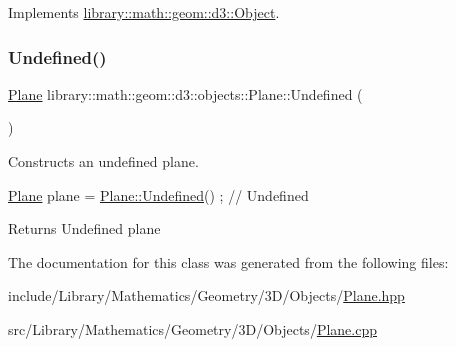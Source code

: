 Implements \hyperlink{classlibrary_1_1math_1_1geom_1_1d3_1_1_object_aa166f4ce4d116a248f0fc861c75012ca}{library\+::math\+::geom\+::d3\+::\+Object}.

\mbox{\label{classlibrary_1_1math_1_1geom_1_1d3_1_1objects_1_1_plane_a582c0e5930dd4a458c557c866b0dae17}} 
\subsubsection{\texorpdfstring{Undefined()}{Undefined()}}
{\footnotesize\ttfamily \hyperlink{classlibrary_1_1math_1_1geom_1_1d3_1_1objects_1_1_plane}{Plane} library\+::math\+::geom\+::d3\+::objects\+::\+Plane\+::\+Undefined (\begin{DoxyParamCaption}{ }\end{DoxyParamCaption})\hspace{0.3cm}{\ttfamily [static]}}



Constructs an undefined plane. 


\begin{DoxyCode}
\hyperlink{classlibrary_1_1math_1_1geom_1_1d3_1_1objects_1_1_plane_a81fe78a983e2cb6ee6ad9bfabd22c3a4}{Plane} plane = \hyperlink{classlibrary_1_1math_1_1geom_1_1d3_1_1objects_1_1_plane_a582c0e5930dd4a458c557c866b0dae17}{Plane::Undefined}() ; \textcolor{comment}{// Undefined}
\end{DoxyCode}


\begin{DoxyReturn}{Returns}
Undefined plane 
\end{DoxyReturn}


The documentation for this class was generated from the following files\+:\begin{DoxyCompactItemize}
\item 
include/\+Library/\+Mathematics/\+Geometry/3\+D/\+Objects/\hyperlink{_plane_8hpp}{Plane.\+hpp}\item 
src/\+Library/\+Mathematics/\+Geometry/3\+D/\+Objects/\hyperlink{_plane_8cpp}{Plane.\+cpp}\end{DoxyCompactItemize}

